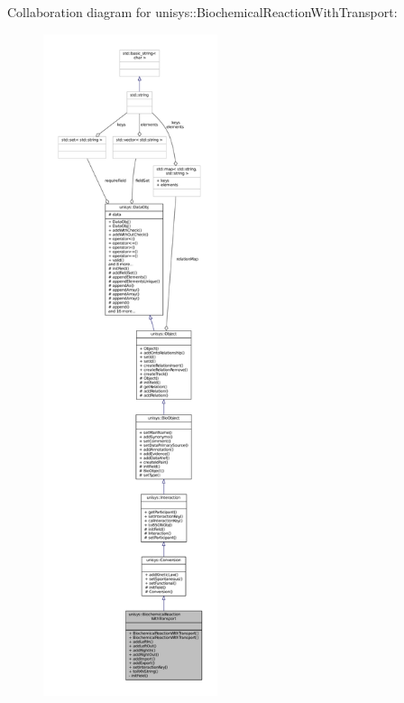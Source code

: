 Collaboration diagram for unisys\-:\-:Biochemical\-Reaction\-With\-Transport\-:
\nopagebreak
\begin{figure}[H]
\begin{center}
\leavevmode
\includegraphics[height=550pt]{classunisys_1_1BiochemicalReactionWithTransport__coll__graph}
\end{center}
\end{figure}
